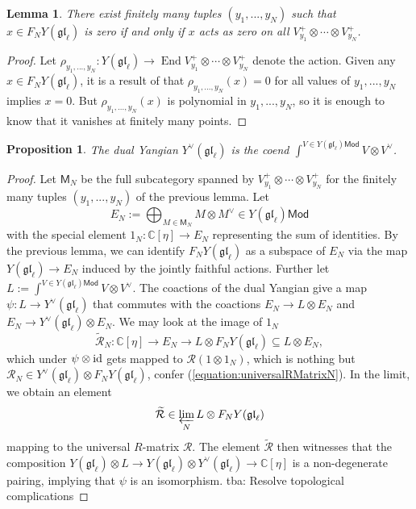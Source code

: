 \documentclass[11pt]{report}
\newtheorem{lemma}[theorem]{Lemma}
\newtheorem{prop}[theorem]{Proposition}
\theoremstyle{definition}
\theoremstyle{remark}
\theoremstyle{remark}
\newcommand{\End}{\operatorname{End}}
\newcommand{\id}{\textnormal{id}}
\newcommand{\C}{\mathbb{C}}
\begin{document}
\begin{lemma}
There exist finitely many tuples $(y_1,...,y_N)$ such that $x \in F_N Y(\mathfrak{gl}_\ell)$ is zero if and only if $x$ acts as zero on all $V_{y_1}^+ \otimes \cdots \otimes V_{y_N}^+$.
\end{lemma}

\begin{proof}
Let $\rho_{y_1,...,y_N}: Y(\mathfrak{gl}_\ell) \to \End V_{y_1}^+ \otimes \cdots \otimes V_{y_N}^+$ denote the action. Given any $x \in F_N Y(\mathfrak{gl}_\ell)$, it is a result of \cite{article:nazarov:2019} that $\rho_{y_1,...,y_N}(x) = 0$ for all values of $y_1,...,y_N$ implies $x = 0$. But $\rho_{y_1,...,y_N}(x)$ is polynomial in $y_1,...,y_N$, so it is enough to know that it vanishes at finitely many points.
\end{proof}

\begin{prop}
The dual Yangian $Y^\vee(\mathfrak{gl}_\ell)$ is the coend $\int^{V \in Y(\mathfrak{gl}_\ell)\mathsf{Mod}} V \otimes V^\vee$.
\end{prop}

\begin{proof}
Let $\mathsf{M}_N$ be the full subcategory spanned by $V_{y_1}^+ \otimes \cdots \otimes V_{y_N}^+$ for the finitely many tuples $(y_1,...,y_N)$ of the previous lemma. Let
\begin{equation*}
E_N := \bigoplus_{M \in \mathsf{M}_N} M \otimes M^\vee \in Y(\mathfrak{gl}_\ell)\mathsf{Mod}
\end{equation*}
with the special element $1_N: \C[\eta] \to E_N$ representing the sum of identities. By the previous lemma, we can identify $F_N Y(\mathfrak{gl}_\ell)$ as a subspace of $E_N$ via the map $Y(\mathfrak{gl}_\ell) \to E_N$ induced by the jointly faithful actions. Further let $L := \int^{V \in Y(\mathfrak{gl}_\ell)\mathsf{Mod}} V \otimes V^\vee$. The coactions of the dual Yangian give a map $\psi: L \to Y^\vee(\mathfrak{gl}_\ell)$ that commutes with the coactions $E_N \to L \otimes E_N$ and $E_N \to Y^\vee(\mathfrak{gl}_\ell) \otimes E_N$. We may look at the image of $1_N$
\begin{equation*}
\widetilde{\mathcal{R}}_N: \C[\eta] \to E_N \to L \otimes F_N Y(\mathfrak{gl}_\ell) \subseteq L \otimes E_N,
\end{equation*}
which under $\psi \otimes \id$ gets mapped to $\mathcal{R}(1 \otimes 1_N)$, which is nothing but $\mathcal{R}_N \in Y^\vee(\mathfrak{gl}_\ell) \otimes F_N Y(\mathfrak{gl}_\ell)$, confer (\ref{equation:universalRMatrixN}). In the limit, we obtain an element
\begin{equation*}
\widetilde{\mathcal{R}} \in \varprojlim_N L \otimes F_N Y(\mathfrak{gl}_\ell)
\end{equation*}
mapping to the universal $R$-matrix $\mathcal{R}$. The element $\widetilde{\mathcal{R}}$ then witnesses that the composition $Y(\mathfrak{gl}_\ell) \otimes L \to Y(\mathfrak{gl}_\ell) \otimes Y^\vee(\mathfrak{gl}_\ell) \to \C[\eta]$ is a non-degenerate pairing, implying that $\psi$ is an isomorphism. tba: Resolve topological complications
\end{proof}
\end{document}
